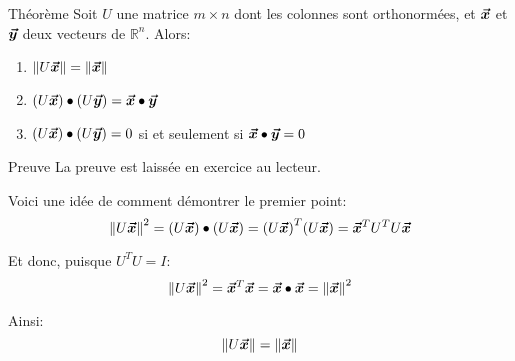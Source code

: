 \documentclass[a4paper]{article}
\begin{document}
\begin{parag}{Théorème}
    Soit $U$ une matrice $m \times n$ dont les colonnes sont orthonormées, et $\bm{\protect\vec{x}}$ et $\bm{\protect\vec{y}}$ deux vecteurs de $\mathbb{R}^n$. Alors:
    \begin{enumerate}
        \item $\left\|U \bvec{x}\right\| = \left\|\bvec{x}\right\|$
        \item $\left(U \bvec{x}\right) \dotprod \left(U \bvec{y}\right) = \bvec{x} \dotprod \bvec{y}$
        \item $\left(U \bvec{x}\right) \dotprod \left(U \bvec{y}\right) = 0$ si et seulement si $\bm{\protect\vec{x}} \bullet \bm{\protect\vec{y}} = 0$
    \end{enumerate}

    \begin{subparag}{Preuve}
        La preuve est laissée en exercice au lecteur.

        Voici une idée de comment démontrer le premier point:
        \[\left\|U \bvec{x}\right\|^2 = \left(U \bvec{x}\right) \dotprod \left(U \bvec{x}\right) = \left(U \bvec{x}\right)^T \left(U \bvec{x}\right) = \bvec{x}^T U^T U \bvec{x} \]

        Et donc, puisque $U^T U = I$:
        \[\left\|U \bvec{x}\right\|^2 = \bvec{x}^T \bvec{x} = \bvec{x} \dotprod \bvec{x} = \left\|\bvec{x}\right\|^2\]

        Ainsi:
        \[\left\|U \bvec{x}\right\| = \left\|\bvec{x}\right\|\]
    \end{subparag}
\end{parag}
\end{document}
